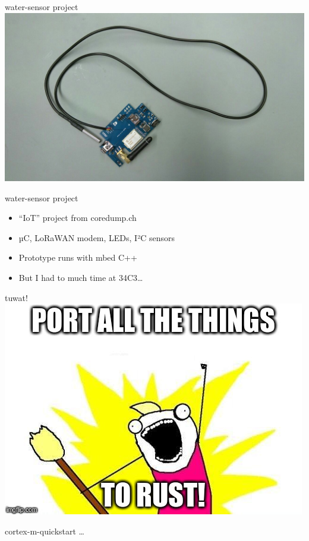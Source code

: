 \documentclass[aspectratio=1610,14pt,t]{beamer}
\begin{document}
\begin{frame}[c]{water-sensor project}
  \centering
  \includegraphics[width=.9\textwidth]{img/water-sensor-pcb.png}
\end{frame}

\begin{frame}[c]{water-sensor project}
  \begin{itemize}
    \item ``IoT'' project from coredump.ch
    \item µC, LoRaWAN modem, LEDs, I²C sensors
    \item Prototype runs with mbed C++
    \item<2-> But I had to much time at 34C3\ldots
  \end{itemize}
\end{frame}

\begin{frame}[c]{tuwat!}
  \centering
  \includegraphics[width=.8\textwidth]{img/port-all-the-things.jpg}
\end{frame}

\begin{frame}[c]{cortex-m-quickstart}
  \ldots
\end{frame}
\end{document}
